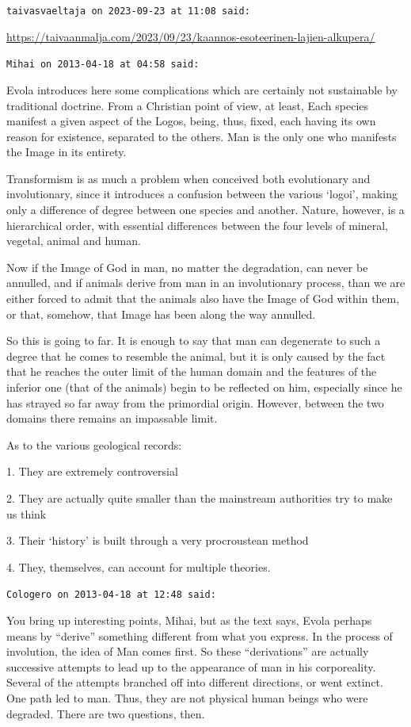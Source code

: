 \begin{footnotesize}
\begin{sffamily}
\texttt{taivasvaeltaja on 2023-09-23 at 11:08 said:}

\url{https://taivaanmalja.com/2023/09/23/kaannos-esoteerinen-lajien-alkupera/}

\hfill

\texttt{Mihai on 2013-04-18 at 04:58 said:}

Evola introduces here some complications which are certainly not sustainable by traditional doctrine. From a Christian point of view, at least, Each species manifest a given aspect of the Logos, being, thus, fixed, each having its own reason for existence, separated to the others. Man is the only one who manifests the Image in its entirety.

Transformism is as much a problem when conceived both evolutionary and involutionary, since it introduces a confusion between the various `logoi', making only a difference of degree between one species and another. Nature, however, is a hierarchical order, with essential differences between the four levels of mineral, vegetal, animal and human.

Now if the Image of God in man, no matter the degradation, can never be annulled, and if animals derive from man in an involutionary process, than we are either forced to admit that the animals also have the Image of God within them, or that, somehow, that Image has been along the way annulled.

So this is going to far. It is enough to say that man can degenerate to such a degree that he comes to resemble the animal, but it is only caused by the fact that he reaches the outer limit of the human domain and the features of the inferior one (that of the animals) begin to be reflected on him, especially since he has strayed so far away from the primordial origin. However, between the two domains there remains an impassable limit.

As to the various geological records:

1. They are extremely controversial

2. They are actually quite smaller than the mainstream authorities try to make us think

3. Their `history' is built through a very procroustean method

4. They, themselves, can account for multiple theories.

\hfill

\texttt{Cologero on 2013-04-18 at 12:48 said:}

You bring up interesting points, Mihai, but as the text says, Evola perhaps means by ``derive'' something different from what you express. In the process of involution, the idea of Man comes first. So these ``derivations'' are actually successive attempts to lead up to the appearance of man in his corporeality. Several of the attempts branched off into different directions, or went extinct. One path led to man. Thus, they are not physical human beings who were degraded. There are two questions, then.


\end{sffamily}
\end{footnotesize}

